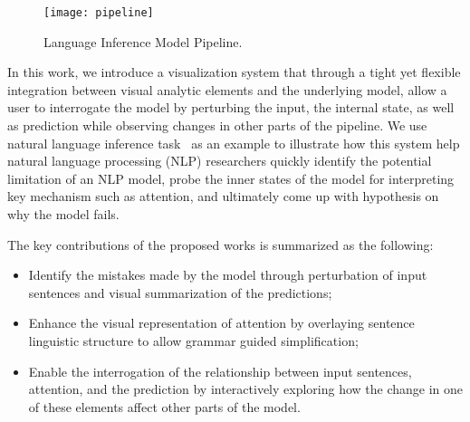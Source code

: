 \begin{figure}[htbp]
\centering
\vspace{-2mm}
 \texttt{[image: pipeline]}
 \caption{Language Inference Model Pipeline.}
\label{fig:projTransition}
\end{figure}

In this work, we introduce a visualization system that through a tight yet flexible integration between visual analytic elements and the underlying model, allow a user to interrogate the model by perturbing the input, the internal state, as well as prediction while observing changes in other parts of the pipeline.
We use natural language inference task~\cite{BowmanAngeliPotts2015} as an example to illustrate how this system help natural language processing (NLP) researchers quickly identify the potential limitation of an NLP model, probe the inner states of the model for interpreting key mechanism such as attention, and ultimately come up with hypothesis on why the model fails.

%
%


The key contributions of the proposed works is summarized as the following:
\begin{itemize}
    \item Identify the mistakes made by the model through perturbation of input sentences and visual summarization of the predictions;

    \item Enhance the visual representation of attention by overlaying sentence linguistic structure to allow grammar guided simplification;

    \item Enable the interrogation of the relationship between input sentences, attention, and the prediction by interactively exploring how the change in one of these elements affect other parts of the model.

\end{itemize}
